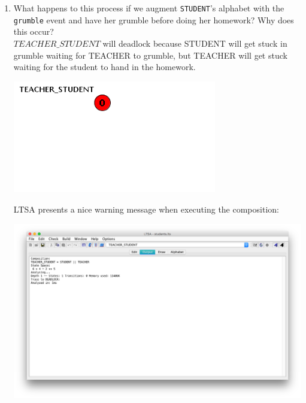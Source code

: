 \documentclass{article}
\begin{document}
\begin{enumerate}
\begin{enumerate}
  
\item What happens to this process if we augment \texttt{STUDENT}'s alphabet with the \texttt{grumble} event and
have her grumble before doing her homework? Why does this occur? \\

$TEACHER\_STUDENT$ will deadlock because STUDENT will get stuck in grumble waiting for TEACHER to grumble, but TEACHER will get stuck waiting for the student to hand in the homework. 

\begin{center}
\includegraphics[width=3.5in]{DEADLOCK.png}
\end{center}
LTSA presents a nice warning message when executing the composition: 
\begin{center}
\includegraphics[width=5in]{DEADLOCK2.png}
\end{center}


\end{enumerate}
\end{enumerate}
\end{document}

